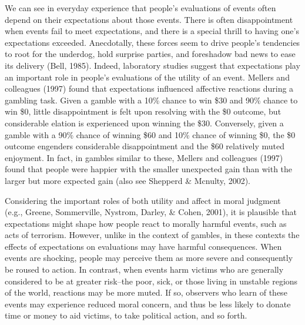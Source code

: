 \documentclass[10pt, letterpaper]{article}
\begin{document}
We can see in everyday experience that people's evaluations of events
often depend on their expectations about those events. There is often
disappointment when events fail to meet expectations, and there is a
special thrill to having one's expectations exceeded. Anecdotally, these
forces seem to drive people's tendencies to root for the underdog, hold
surprise parties, and foreshadow bad news to ease its delivery (Bell,
1985). Indeed, laboratory studies suggest that expectations play an
important role in people's evaluations of the utility of an event.
Mellers and colleagues (1997) found that expectations influenced
affective reactions during a gambling task. Given a gamble with a 10\%
chance to win \$30 and 90\% chance to win \$0, little disappointment is
felt upon resolving with the \$0 outcome, but considerable elation is
experienced upon winning the \$30. Conversely, given a gamble with a
90\% chance of winning \$60 and 10\% chance of winning \$0, the \$0
outcome engenders considerable disappointment and the \$60 relatively
muted enjoyment. In fact, in gambles similar to these, Mellers and
colleagues (1997) found that people were happier with the smaller
unexpected gain than with the larger but more expected gain (also see
Shepperd \& Mcnulty, 2002).

Considering the important roles of both utility and affect in moral
judgment (e.g., Greene, Sommerville, Nystrom, Darley, \& Cohen, 2001),
it is plausible that expectations might shape how people react to
morally harmful events, such as acts of terrorism. However, unlike in
the context of gambles, in these contexts the effects of expectations on
evaluations may have harmful consequences. When events are shocking,
people may perceive them as more severe and consequently be roused to
action. In contrast, when events harm victims who are generally
considered to be at greater risk--the poor, sick, or those living in
unstable regions of the world, reactions may be more muted. If so,
observers who learn of these events may experience reduced moral
concern, and thus be less likely to donate time or money to aid victims,
to take political action, and so forth.
\end{document}
